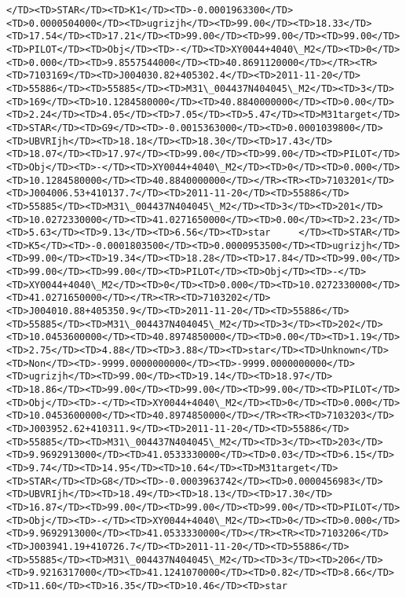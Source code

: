 \documentclass[11pt]{article}
\begin{document}
\begin{Verbatim}[commandchars=\\\{\}]
</TD><TD>STAR</TD><TD>K1</TD><TD>-0.0001963300</TD><TD>0.0000504000</TD><TD>ugrizjh</TD><TD>99.00</TD><TD>18.33</TD><TD>17.54</TD><TD>17.21</TD><TD>99.00</TD><TD>99.00</TD><TD>99.00</TD><TD>PILOT</TD><TD>Obj</TD><TD>-</TD><TD>XY0044+4040\_M2</TD><TD>0</TD><TD>0.000</TD><TD>9.8557544000</TD><TD>40.8691120000</TD></TR><TR><TD>7103169</TD><TD>J004030.82+405302.4</TD><TD>2011-11-20</TD><TD>55886</TD><TD>55885</TD><TD>M31\_004437N404045\_M2</TD><TD>3</TD><TD>169</TD><TD>10.1284580000</TD><TD>40.8840000000</TD><TD>0.00</TD><TD>2.24</TD><TD>4.05</TD><TD>7.05</TD><TD>5.47</TD><TD>M31target</TD><TD>STAR</TD><TD>G9</TD><TD>-0.0015363000</TD><TD>0.0001039800</TD><TD>UBVRIjh</TD><TD>18.18</TD><TD>18.30</TD><TD>17.43</TD><TD>18.07</TD><TD>17.97</TD><TD>99.00</TD><TD>99.00</TD><TD>PILOT</TD><TD>Obj</TD><TD>-</TD><TD>XY0044+4040\_M2</TD><TD>0</TD><TD>0.000</TD><TD>10.1284580000</TD><TD>40.8840000000</TD></TR><TR><TD>7103201</TD><TD>J004006.53+410137.7</TD><TD>2011-11-20</TD><TD>55886</TD><TD>55885</TD><TD>M31\_004437N404045\_M2</TD><TD>3</TD><TD>201</TD><TD>10.0272330000</TD><TD>41.0271650000</TD><TD>0.00</TD><TD>2.23</TD><TD>5.63</TD><TD>9.13</TD><TD>6.56</TD><TD>star     </TD><TD>STAR</TD><TD>K5</TD><TD>-0.0001803500</TD><TD>0.0000953500</TD><TD>ugrizjh</TD><TD>99.00</TD><TD>19.34</TD><TD>18.28</TD><TD>17.84</TD><TD>99.00</TD><TD>99.00</TD><TD>99.00</TD><TD>PILOT</TD><TD>Obj</TD><TD>-</TD><TD>XY0044+4040\_M2</TD><TD>0</TD><TD>0.000</TD><TD>10.0272330000</TD><TD>41.0271650000</TD></TR><TR><TD>7103202</TD><TD>J004010.88+405350.9</TD><TD>2011-11-20</TD><TD>55886</TD><TD>55885</TD><TD>M31\_004437N404045\_M2</TD><TD>3</TD><TD>202</TD><TD>10.0453600000</TD><TD>40.8974850000</TD><TD>0.00</TD><TD>1.19</TD><TD>2.75</TD><TD>4.88</TD><TD>3.88</TD><TD>star</TD><TD>Unknown</TD><TD>Non</TD><TD>-9999.0000000000</TD><TD>-9999.0000000000</TD><TD>ugrizjh</TD><TD>99.00</TD><TD>19.14</TD><TD>18.97</TD><TD>18.86</TD><TD>99.00</TD><TD>99.00</TD><TD>99.00</TD><TD>PILOT</TD><TD>Obj</TD><TD>-</TD><TD>XY0044+4040\_M2</TD><TD>0</TD><TD>0.000</TD><TD>10.0453600000</TD><TD>40.8974850000</TD></TR><TR><TD>7103203</TD><TD>J003952.62+410311.9</TD><TD>2011-11-20</TD><TD>55886</TD><TD>55885</TD><TD>M31\_004437N404045\_M2</TD><TD>3</TD><TD>203</TD><TD>9.9692913000</TD><TD>41.0533330000</TD><TD>0.03</TD><TD>6.15</TD><TD>9.74</TD><TD>14.95</TD><TD>10.64</TD><TD>M31target</TD><TD>STAR</TD><TD>G8</TD><TD>-0.0003963742</TD><TD>0.0000456983</TD><TD>UBVRIjh</TD><TD>18.49</TD><TD>18.13</TD><TD>17.30</TD><TD>16.87</TD><TD>99.00</TD><TD>99.00</TD><TD>99.00</TD><TD>PILOT</TD><TD>Obj</TD><TD>-</TD><TD>XY0044+4040\_M2</TD><TD>0</TD><TD>0.000</TD><TD>9.9692913000</TD><TD>41.0533330000</TD></TR><TR><TD>7103206</TD><TD>J003941.19+410726.7</TD><TD>2011-11-20</TD><TD>55886</TD><TD>55885</TD><TD>M31\_004437N404045\_M2</TD><TD>3</TD><TD>206</TD><TD>9.9216317000</TD><TD>41.1241070000</TD><TD>0.82</TD><TD>8.66</TD><TD>11.60</TD><TD>16.35</TD><TD>10.46</TD><TD>star     
\end{Verbatim}
\end{document}
